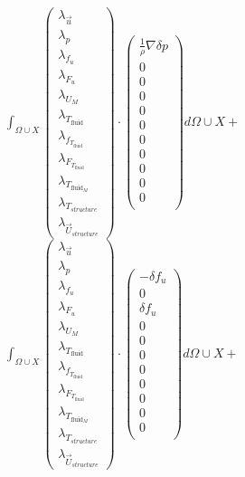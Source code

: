 \documentclass[10pt]{article} %
\begin{document}
\begin{center}
	$\int_{\Omega \cup X}
	\begin{pmatrix}
		\lambda_{\vec{u}} \\ \lambda_p \\ \lambda_{f_u} \\ \lambda_{F_u} \\ \lambda_{U_M}\\ \lambda_{T_{\text{fluid}}} \\ \lambda_{f_{T_{\text{fluid}}}} \\ \lambda_{F_{T_{\text{fluid}}}} \\ \lambda_{T_{\text{fluid}_M}} \\ \lambda_{T_{structure}} \\ \lambda_{\vec{U}_{structure}}
	\end{pmatrix}
	\cdot
	\begin{pmatrix}
		\frac{1}{\rho} \nabla \delta p \\
		0\\
		0 \\
		0 \\
		0 \\
		0 \\
		0\\
		0\\
		0\\
		0\\
		0\\
	\end{pmatrix}
	d\Omega \cup X + $\\

	$\int_{\Omega \cup X}
	\begin{pmatrix}
		\lambda_{\vec{u}} \\ \lambda_p \\ \lambda_{f_u} \\ \lambda_{F_u} \\ \lambda_{U_M}\\ \lambda_{T_{\text{fluid}}} \\ \lambda_{f_{T_{\text{fluid}}}} \\ \lambda_{F_{T_{\text{fluid}}}} \\ \lambda_{T_{\text{fluid}_M}} \\ \lambda_{T_{structure}} \\ \lambda_{\vec{U}_{structure}}
	\end{pmatrix}
	\cdot
	\begin{pmatrix}
		-\delta f_u \\
		0\\
		\delta f_u \\
		0 \\
		0 \\
		0 \\
		0\\
		0\\
		0\\
		0\\
		0\\
	\end{pmatrix}
	d\Omega \cup X + $\\


\end{center}
\end{document}
